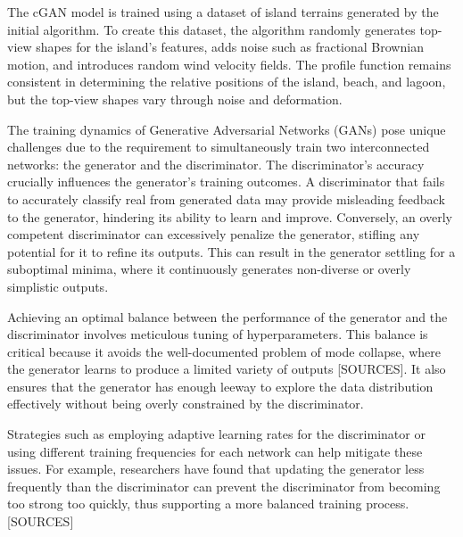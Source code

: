 The cGAN model is trained using a dataset of island terrains generated by the initial algorithm. To create this dataset, the algorithm randomly generates top-view shapes for the island's features, adds noise such as fractional Brownian motion, and introduces random wind velocity fields. The profile function remains consistent in determining the relative positions of the island, beach, and lagoon, but the top-view shapes vary through noise and deformation.

The training dynamics of Generative Adversarial Networks (GANs) pose unique challenges due to the requirement to simultaneously train two interconnected networks: the generator and the discriminator. The discriminator's accuracy crucially influences the generator's training outcomes. A discriminator that fails to accurately classify real from generated data may provide misleading feedback to the generator, hindering its ability to learn and improve. Conversely, an overly competent discriminator can excessively penalize the generator, stifling any potential for it to refine its outputs. This can result in the generator settling for a suboptimal minima, where it continuously generates non-diverse or overly simplistic outputs.

Achieving an optimal balance between the performance of the generator and the discriminator involves meticulous tuning of hyperparameters. This balance is critical because it avoids the well-documented problem of mode collapse, where the generator learns to produce a limited variety of outputs [SOURCES]. It also ensures that the generator has enough leeway to explore the data distribution effectively without being overly constrained by the discriminator.

Strategies such as employing adaptive learning rates for the discriminator or using different training frequencies for each network can help mitigate these issues. For example, researchers have found that updating the generator less frequently than the discriminator can prevent the discriminator from becoming too strong too quickly, thus supporting a more balanced training process. [SOURCES]


